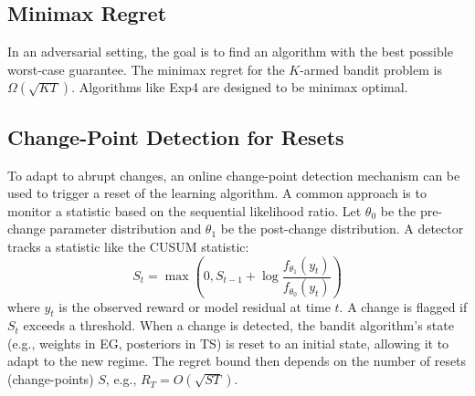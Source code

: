 \documentclass{article}
\begin{document}
\subsection{Minimax Regret}
In an adversarial setting, the goal is to find an algorithm with the best possible worst-case guarantee. The minimax regret for the $K$-armed bandit problem is $\Omega(\sqrt{KT})$. Algorithms like Exp4 are designed to be minimax optimal.

\subsection{Change-Point Detection for Resets}
To adapt to abrupt changes, an online change-point detection mechanism can be used to trigger a reset of the learning algorithm. A common approach is to monitor a statistic based on the sequential likelihood ratio. Let $\theta_0$ be the pre-change parameter distribution and $\theta_1$ be the post-change distribution. A detector tracks a statistic like the CUSUM statistic:
\begin{equation}
    S_t = \max(0, S_{t-1} + \log \frac{f_{\theta_1}(y_t)}{f_{\theta_0}(y_t)})
\end{equation}
where $y_t$ is the observed reward or model residual at time $t$. A change is flagged if $S_t$ exceeds a threshold. When a change is detected, the bandit algorithm's state (e.g., weights in EG, posteriors in TS) is reset to an initial state, allowing it to adapt to the new regime. The regret bound then depends on the number of resets (change-points) $S$, e.g., $R_T = O(\sqrt{ST})$.
\end{document}
